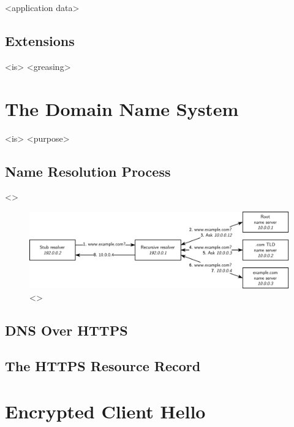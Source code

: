 <application data>

\subsection{Extensions}

<is>
<greasing>








\section{The Domain Name System}

<is>
<purpose>

\subsection{Name Resolution Process}

<>

\begin{figure}[ht]
\centerline{\includegraphics[width=160mm]{images/dns-resolve.png}}
\caption[Example DNS name resolution process]{<>}
\label{dns_resolve_figure}
\end{figure}

\subsection{DNS Over HTTPS}

\blindtext

\subsection{The HTTPS Resource Record}

\blindtext








\section{Encrypted Client Hello}

